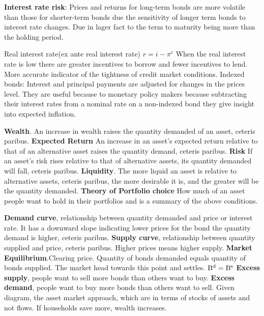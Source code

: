 \documentclass[12pt]{examnotes}
\begin{document}
\textbf{Interest rate risk}: Prices and returns for long-term bonds are more volatile than those for shorter-term bonds due the sensitivity of longer term bonds to interest rate changes. Due in lager fact to the term to maturity being more than the holding period.

Real interest rate(ex ante real interest rate) $r=i-\pi^e$ 
When the real interest rate is low there are greater incentives to borrow and fewer incentives to lend. 
More accurate indicator of the tightness of credit market conditions. 
Indexed bonds: Interest and principal payments are adjusted for changes in the prices level. They are useful because to monetary policy makers because subtracting their interest rates from a nominal rate on a non-indexed bond they give insight into expected inflation.

\textbf{Wealth}. An increase in wealth raises the quantity demanded of an asset, ceteris paribus. 
\textbf{Expected Return} An increase in an asset's expected return relative to that of an alternative asset raises the quantity demand, ceteris paribus. 
\textbf{Risk} If an asset's risk rises relative to that of alternative assets, its quantity demanded will fall, ceteris paribus. 
\textbf{Liquidity}. The more liquid an asset is relative to alternative assets, ceteris paribus, the more desirable it is, and the greater will be the quantity demanded. 
\textbf{Theory of Portfolio choice} How much of an asset people want to hold in their portfolios and is a summary of the above conditions. 

\textbf{Demand curve}, relationship between quantity demanded and price or interest rate. It has a downward slope indicating lower prices for the bond the quantity demand is higher, ceteris paribus.
\textbf{Supply curve}, relationship between quantity supplied and price, ceteris paribus. Higher prices means higher supply.
\textbf{Market Equilibrium}.Clearing price. Quantity of bonds demanded equals quantity of bonds supplied. The market head towards this point and settles. $\rm{B^d}=\rm{B^s}$
\textbf{Excess supply}, people want to sell more bonds than others want to buy. \textbf{Excess demand}, people want to buy more bonds than others want to sell. 
Given diagram, the asset market approach, which are in terms of stocks of assets and not flows.
If households save more, wealth increases.
\end{document}
